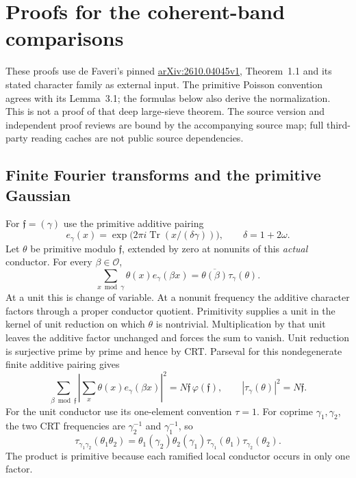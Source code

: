 \section{Proofs for the coherent-band comparisons}
\label{cbk:details}
These proofs use de Faveri's pinned
\href{https://arxiv.org/abs/2610.04045v1}{arXiv:2610.04045v1},
Theorem~1.1 and its stated character family as external input. The
primitive Poisson convention agrees with its Lemma~3.1; the formulas
below also derive the normalization. This is not a proof of that deep
large-sieve theorem. The source version and independent proof reviews
are bound by the accompanying source map; full third-party reading
caches are not public source dependencies.

\subsection{Finite Fourier transforms and the primitive Gaussian}
\label{cbk:gaussian-proof}
For $\mathfrak f=(\gamma)$ use the primitive additive pairing
\[
 e_\gamma(x)=\exp\bigl(2\pi i\operatorname{Tr}(x/(\delta\gamma))\bigr),
 \qquad \delta=1+2\omega.
\]
Let $\theta$ be primitive modulo $\mathfrak f$, extended by zero at
nonunits of this \emph{actual} conductor. For every $\beta\in\mathcal O$,
\begin{equation}\label{cbk:finite-Fourier}
 \sum_{x\bmod\gamma}\theta(x)e_\gamma(\beta x)
          =\overline{\theta(\beta)}\tau_\gamma(\theta).
\end{equation}
At a unit this is change of variable. At a nonunit frequency the
additive character factors through a proper conductor quotient.
Primitivity supplies a unit in the kernel of unit reduction on which
$\theta$ is nontrivial. Multiplication by that unit leaves the additive
factor unchanged and forces the sum to vanish. Unit reduction is
surjective prime by prime and hence by CRT. Parseval for this
nondegenerate finite additive pairing gives
\[
 \sum_{\beta\bmod\mathfrak f}
   \left|\sum_x\theta(x)e_\gamma(\beta x)\right|^2
       =N\mathfrak f\,\varphi(\mathfrak f),\qquad
 |\tau_\gamma(\theta)|^2=N\mathfrak f.
\]
For the unit conductor use its one-element convention $\tau=1$.
For coprime $\gamma_1,\gamma_2$, the two CRT frequencies are
$\gamma_2^{-1}$ and $\gamma_1^{-1}$, so
\begin{equation}\label{cbk:Gauss-CRT}
 \tau_{\gamma_1\gamma_2}(\theta_1\theta_2)
 =\theta_1(\gamma_2)\theta_2(\gamma_1)
                        \tau_{\gamma_1}(\theta_1)\tau_{\gamma_2}(\theta_2).
\end{equation}
The product is primitive because each ramified local conductor occurs
in only one factor.

